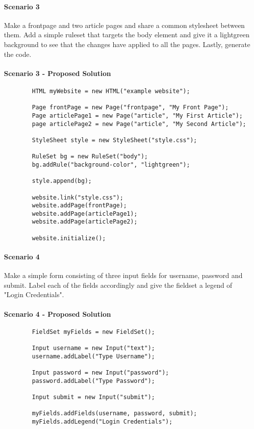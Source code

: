\documentclass[12pt]{article}
\begin{document}
    \paragraph{Scenario 3}
    Make a frontpage and two article pages and share a common stylesheet between them. Add a simple ruleset that targets the body element and give it a lightgreen background to see that the changes have applied to all the pages. Lastly, generate the code.

    \paragraph{Scenario 3 - Proposed Solution}

    \begin{lstlisting}
        HTML myWebsite = new HTML("example website");
        
        Page frontPage = new Page("frontpage", "My Front Page");
        Page articlePage1 = new Page("article", "My First Article");
        page articlePage2 = new Page("article", "My Second Article");

        StyleSheet style = new StyleSheet("style.css");

        RuleSet bg = new RuleSet("body");
        bg.addRule("background-color", "lightgreen");

        style.append(bg);

        website.link("style.css");
        website.addPage(frontPage);
        website.addPage(articlePage1);
        website.addPage(articlePage2);

        website.initialize();
    \end{lstlisting}

    \paragraph{Scenario 4}
    Make a simple form consisting of three input fields for username, password and submit. Label each of the fields accordingly and give the fieldset a legend of "Login Credentials".

    \paragraph{Scenario 4 - Proposed Solution}

    \begin{lstlisting}
        FieldSet myFields = new FieldSet();

        Input username = new Input("text");
        username.addLabel("Type Username");
        
        Input password = new Input("password");
        password.addLabel("Type Password");
        
        Input submit = new Input("submit");

        myFields.addFields(username, password, submit);
        myFields.addLegend("Login Credentials");
    \end{lstlisting}
\end{document}
